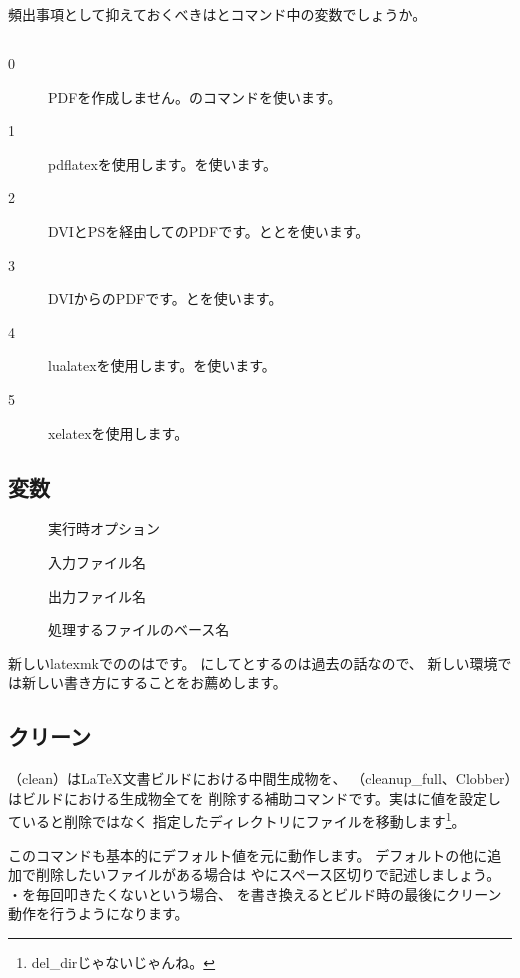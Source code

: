\documentclass[main]{subfiles}
\begin{document}
頻出事項として抑えておくべきはとコマンド中の変数でしょうか。

\subsection{}
\begin{description}
\item[0]{PDFを作成しません。のコマンドを使います。}
\item[1]{pdflatexを使用します。を使います。}
\item[2]{DVIとPSを経由してのPDFです。ととを使います。}
\item[3]{DVIからのPDFです。とを使います。}
\item[4] {lualatexを使用します。を使います。}
\item[5]{xelatexを使用します。}  
\end{description}

\subsection{変数}
\begin{description}
    \item[]{実行時オプション}
    \item[]{入力ファイル名}
    \item[]{出力ファイル名}
    \item[]{処理するファイルのベース名}   
\end{description}

新しいlatexmkでの\LuaLaTeX{}のはです。
にしてとするのは過去の話なので、
新しい環境では新しい書き方にすることをお薦めします。

\subsection{クリーン}
（clean）は\LaTeX{}文書ビルドにおける中間生成物を、
（cleanup_full、Clobber）はビルドにおける生成物全てを
削除する補助コマンドです。実はに値を設定していると削除ではなく
指定したディレクトリにファイルを移動します\footnote{del_dirじゃないじゃんね。}。

このコマンドも基本的にデフォルト値を元に動作します。
デフォルトの他に追加で削除したいファイルがある場合は
やにスペース区切りで記述しましょう。
・を毎回叩きたくないという場合、
を書き換えるとビルド時の最後にクリーン動作を行うようになります。
\end{document}
